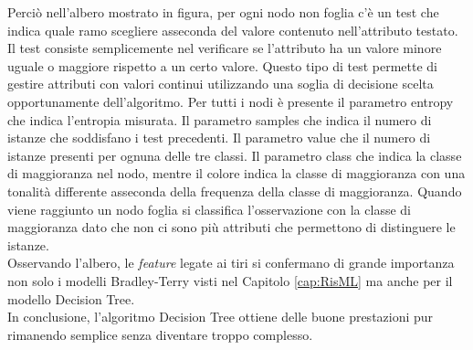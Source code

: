Perciò nell'albero mostrato in figura, per ogni nodo non foglia c'è un test che indica quale ramo scegliere asseconda del valore contenuto nell'attributo testato. Il test consiste semplicemente nel verificare se l'attributo ha un valore minore uguale o maggiore rispetto a un certo valore. Questo tipo di test permette di gestire attributi con valori continui utilizzando una soglia di decisione scelta opportunamente dell'algoritmo. Per tutti i nodi è presente il parametro \textsf{entropy} che indica l'entropia misurata. Il parametro \textsf{samples} che indica il numero di istanze che soddisfano i test precedenti. Il parametro \textsf{value} che il numero di istanze presenti per ognuna delle tre classi. Il parametro \textsf{class} che indica la classe di maggioranza nel nodo, mentre il colore indica la classe di maggioranza con una tonalità differente asseconda della frequenza della classe di maggioranza. Quando viene raggiunto un nodo foglia si classifica l'osservazione con la classe di maggioranza dato che non ci sono più attributi che permettono di distinguere le istanze.\\
Osservando l'albero, le \emph{feature} legate ai tiri si confermano di grande importanza non solo i modelli Bradley-Terry visti nel Capitolo \ref{cap:RisML} ma anche per il modello Decision Tree.\\
In conclusione, l'algoritmo Decision Tree ottiene delle buone prestazioni pur rimanendo semplice senza diventare troppo complesso.

